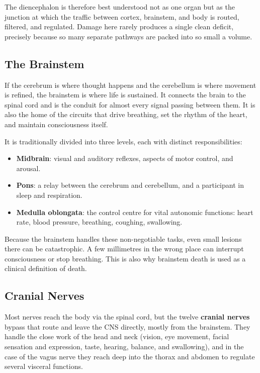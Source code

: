 \documentclass[11pt]{article}
\begin{document}
The diencephalon is therefore best understood not as one organ but as the junction at which the traffic between cortex, brainstem, and body is routed, filtered, and regulated. Damage here rarely produces a single clean deficit, precisely because so many separate pathways are packed into so small a volume.

\subsection{The Brainstem}

If the cerebrum is where thought happens and the cerebellum is where movement is refined, the brainstem is where life is sustained. It connects the brain to the spinal cord and is the conduit for almost every signal passing between them. It is also the home of the circuits that drive breathing, set the rhythm of the heart, and maintain consciousness itself.

It is traditionally divided into three levels, each with distinct responsibilities:

\begin{itemize}
    \item \textbf{Midbrain}: visual and auditory reflexes, aspects of motor control, and arousal.
    \item \textbf{Pons}: a relay between the cerebrum and cerebellum, and a participant in sleep and respiration.
    \item \textbf{Medulla oblongata}: the control centre for vital autonomic functions: heart rate, blood pressure, breathing, coughing, swallowing.
\end{itemize}

Because the brainstem handles these non-negotiable tasks, even small lesions there can be catastrophic. A few millimetres in the wrong place can interrupt consciousness or stop breathing. This is also why brainstem death is used as a clinical definition of death.

\subsection{Cranial Nerves}

Most nerves reach the body via the spinal cord, but the twelve \textbf{cranial nerves} bypass that route and leave the CNS directly, mostly from the brainstem. They handle the close work of the head and neck (vision, eye movement, facial sensation and expression, taste, hearing, balance, and swallowing), and in the case of the vagus nerve they reach deep into the thorax and abdomen to regulate several visceral functions.
\end{document}
